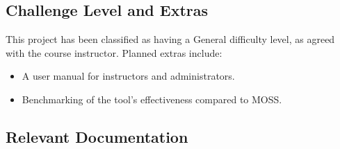 \documentclass[12pt, titlepage]{article}
\begin{document}


\subsection{Challenge Level and Extras}



This project has been classified as having a General difficulty level, as agreed with the course instructor. 
Planned extras include:
\begin{itemize}
  \item A user manual for instructors and administrators.
  \item Benchmarking of the tool’s effectiveness compared to MOSS.
\end{itemize}

\subsection{Relevant Documentation}
\end{document}
